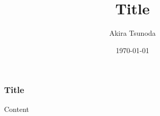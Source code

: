 \documentclass[10pt, aspectratio=169]{beamer}
\begin{document}
\title{Title}
\author{Akira Tsunoda}
\date{\today}

\begin{frame}
    \titlepage
\end{frame}

\begin{frame}
    \frametitle{Title}
    Content
\end{frame}
\end{document}
